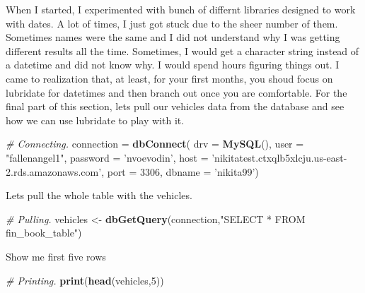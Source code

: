 \documentclass[]{book}
\newenvironment{Shaded}{\begin{snugshade}}{\end{snugshade}}
\newcommand{\CommentTok}[1]{\textcolor[rgb]{0.56,0.35,0.01}{\textit{#1}}}
\newcommand{\DataTypeTok}[1]{\textcolor[rgb]{0.13,0.29,0.53}{#1}}
\newcommand{\DecValTok}[1]{\textcolor[rgb]{0.00,0.00,0.81}{#1}}
\newcommand{\KeywordTok}[1]{\textcolor[rgb]{0.13,0.29,0.53}{\textbf{#1}}}
\newcommand{\NormalTok}[1]{#1}
\newcommand{\StringTok}[1]{\textcolor[rgb]{0.31,0.60,0.02}{#1}}
\begin{document}
When I started, I experimented with bunch of differnt libraries designed to work with dates. A lot of times, I just got stuck due to the sheer number of them. Sometimes names were the same and I did not understand why I was getting different results all the time. Sometimes, I would get a character string instead of a datetime and did not know why. I would spend hours figuring things out. I came to realization that, at least, for your first months, you shoud focus on lubridate for datetimes and then branch out once you are comfortable. For the final part of this section, lets pull our vehicles data from the database and see how we can use lubridate to play with it.

\begin{Shaded}
\begin{Highlighting}[]
\CommentTok{# Connecting.}
\NormalTok{connection =}\StringTok{ }\KeywordTok{dbConnect}\NormalTok{(}
  \DataTypeTok{drv =} \KeywordTok{MySQL}\NormalTok{(), }
  \DataTypeTok{user =} \StringTok{"fallenangel1"}\NormalTok{,}
  \DataTypeTok{password =} \StringTok{'nvoevodin'}\NormalTok{,}
  \DataTypeTok{host =} \StringTok{'nikitatest.ctxqlb5xlcju.us-east-2.rds.amazonaws.com'}\NormalTok{,}
  \DataTypeTok{port =} \DecValTok{3306}\NormalTok{,}
  \DataTypeTok{dbname =} \StringTok{'nikita99'}\NormalTok{)}
\end{Highlighting}
\end{Shaded}

Lets pull the whole table with the vehicles.

\begin{Shaded}
\begin{Highlighting}[]
\CommentTok{# Pulling.}
\NormalTok{vehicles <-}\StringTok{ }\KeywordTok{dbGetQuery}\NormalTok{(connection,}\StringTok{"SELECT * FROM fin_book_table"}\NormalTok{)}
\end{Highlighting}
\end{Shaded}

Show me first five rows

\begin{Shaded}
\begin{Highlighting}[]
\CommentTok{# Printing.}
\KeywordTok{print}\NormalTok{(}\KeywordTok{head}\NormalTok{(vehicles,}\DecValTok{5}\NormalTok{))}
\end{Highlighting}
\end{Shaded}
\end{document}
